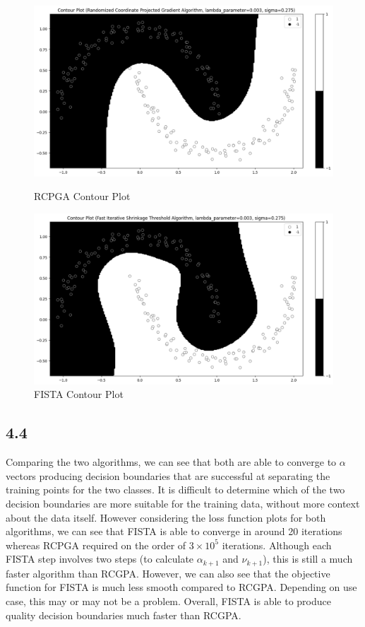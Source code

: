 \documentclass[12pt]{article}
\begin{document}
\begin{figure}[h]
\centering
\begin{minipage}{.5\textwidth}
  \centering
\includegraphics[scale=0.3]{outputs/part_4/rcpga-contour}
\caption{RCPGA Contour Plot}
\label{fig:}
\end{minipage}%
\begin{minipage}{.5\textwidth}
  \centering
\includegraphics[scale=0.3]{outputs/part_4/fista-contour}
\caption{FISTA Contour Plot}
\label{fig:}
\end{minipage}
\end{figure}

\subsection*{4.4}
Comparing the two algorithms, we can see that both are able to converge to $\alpha$ vectors producing decision boundaries that are successful at separating the training points for the two classes. It is difficult to determine which of the two decision boundaries are more suitable for the training data, without more context about the data itself. However considering the loss function plots for both algorithms, we can see that FISTA is able to converge in around 20 iterations whereas RCPGA required on the order of $3\times 10^{5}$ iterations. Although each FISTA step involves two steps (to calculate $\alpha_{k+1}$ and $\nu_{k+1}$), this is still a much faster algorithm than RCGPA. However, we can also see that the objective function for FISTA is much less smooth compared to RCGPA. Depending on use case, this may or may not be a problem. Overall, FISTA is able to produce quality decision boundaries much faster than RCGPA.
\end{document}

